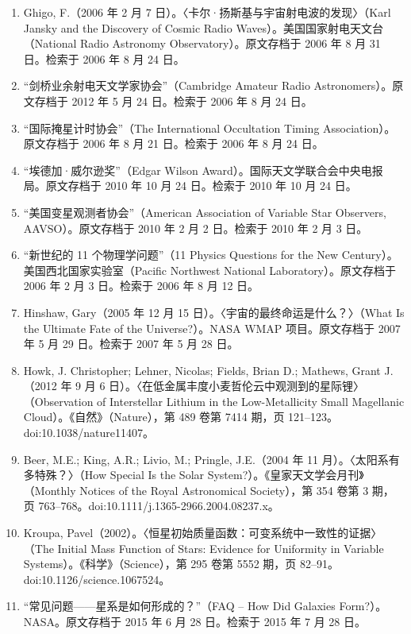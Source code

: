 \begin{enumerate}
  \item Ghigo, F.（2006 年 2 月 7 日）。〈卡尔·扬斯基与宇宙射电波的发现〉（Karl Jansky and the Discovery of Cosmic Radio Waves）。美国国家射电天文台（National Radio Astronomy Observatory）。原文存档于 2006 年 8 月 31 日。检索于 2006 年 8 月 24 日。
  \item “剑桥业余射电天文学家协会”（Cambridge Amateur Radio Astronomers）。原文存档于 2012 年 5 月 24 日。检索于 2006 年 8 月 24 日。
  \item “国际掩星计时协会”（The International Occultation Timing Association）。原文存档于 2006 年 8 月 21 日。检索于 2006 年 8 月 24 日。
  \item “埃德加·威尔逊奖”（Edgar Wilson Award）。国际天文学联合会中央电报局。原文存档于 2010 年 10 月 24 日。检索于 2010 年 10 月 24 日。
  \item “美国变星观测者协会”（American Association of Variable Star Observers, AAVSO）。原文存档于 2010 年 2 月 2 日。检索于 2010 年 2 月 3 日。
  \item “新世纪的 11 个物理学问题”（11 Physics Questions for the New Century）。美国西北国家实验室（Pacific Northwest National Laboratory）。原文存档于 2006 年 2 月 3 日。检索于 2006 年 8 月 12 日。
  \item Hinshaw, Gary（2005 年 12 月 15 日）。〈宇宙的最终命运是什么？〉（What Is the Ultimate Fate of the Universe?）。NASA WMAP 项目。原文存档于 2007 年 5 月 29 日。检索于 2007 年 5 月 28 日。
  \item Howk, J. Christopher; Lehner, Nicolas; Fields, Brian D.; Mathews, Grant J.（2012 年 9 月 6 日）。〈在低金属丰度小麦哲伦云中观测到的星际锂〉（Observation of Interstellar Lithium in the Low-Metallicity Small Magellanic Cloud）。《自然》（Nature），第 489 卷第 7414 期，页 121–123。doi:10.1038/nature11407。
  \item Beer, M.E.; King, A.R.; Livio, M.; Pringle, J.E.（2004 年 11 月）。〈太阳系有多特殊？〉（How Special Is the Solar System?）。《皇家天文学会月刊》（Monthly Notices of the Royal Astronomical Society），第 354 卷第 3 期，页 763–768。doi:10.1111/j.1365-2966.2004.08237.x。
  \item Kroupa, Pavel（2002）。〈恒星初始质量函数：可变系统中一致性的证据〉（The Initial Mass Function of Stars: Evidence for Uniformity in Variable Systems）。《科学》（Science），第 295 卷第 5552 期，页 82–91。doi:10.1126/science.1067524。
  \item “常见问题——星系是如何形成的？”（FAQ – How Did Galaxies Form?）。NASA。原文存档于 2015 年 6 月 28 日。检索于 2015 年 7 月 28 日。

\end{enumerate}
